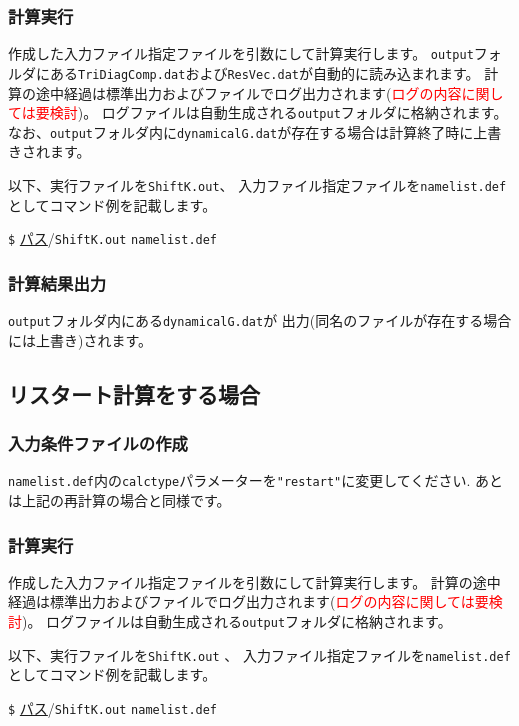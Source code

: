 \documentclass[12pt,titlepage]{jarticle}
\begin{document}
\subsubsection*{計算実行}
作成した入力ファイル指定ファイルを引数にして計算実行します。
\verb|output|フォルダにある\verb|TriDiagComp.dat|および\verb|ResVec.dat|が自動的に読み込まれます。
計算の途中経過は標準出力およびファイルでログ出力されます(\textcolor{red}{ログの内容に関しては要検討})。
ログファイルは自動生成される\verb|output|フォルダに格納されます。
なお、\verb|output|フォルダ内に\verb|dynamicalG.dat|が存在する場合は計算終了時に上書きされます。

以下、実行ファイルを\verb|ShiftK.out|、
入力ファイル指定ファイルを\verb|namelist.def|としてコマンド例を記載します。

\verb|$| \underline{パス}/\verb|ShiftK.out|  \verb|namelist.def|

\subsubsection*{計算結果出力}
\verb|output|フォルダ内にある\verb|dynamicalG.dat|が
出力(同名のファイルが存在する場合には上書き)されます。

\subsection{リスタート計算をする場合}
\subsubsection*{入力条件ファイルの作成}
\verb|namelist.def|内の\verb|calctype|パラメーターを\verb|"restart"|に変更してください.
あとは上記の再計算の場合と同様です。

\subsubsection*{計算実行}
作成した入力ファイル指定ファイルを引数にして計算実行します。
計算の途中経過は標準出力およびファイルでログ出力されます(\textcolor{red}{ログの内容に関しては要検討})。
ログファイルは自動生成される\verb|output|フォルダに格納されます。

以下、実行ファイルを\verb|ShiftK.out| 、
入力ファイル指定ファイルを\verb|namelist.def|としてコマンド例を記載します。

\verb|$| \underline{パス}/\verb|ShiftK.out|  \verb|namelist.def|
\end{document}
